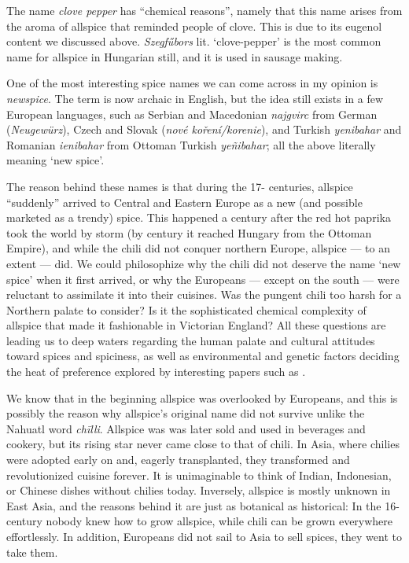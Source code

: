 The name \textit{clove pepper} has ``chemical reasons'', namely that this name arises from the aroma of allspice that reminded people of clove. This is due to its eugenol content we discussed above. \textit{Szegfűbors} lit. `clove-pepper' is the most common name for allspice in Hungarian still, and it is used in sausage making.

One of the most interesting spice names we can come across in my opinion is \textit{newspice}. The term is now archaic in English, but the idea still exists in a few European languages, such as Serbian and Macedonian  \textit{najgvirc} from German (\textit{Neugewürz}), Czech and Slovak (\textit{nové koření/korenie}), and Turkish \textit{yenibahar} and Romanian \textit{ienibahar} from Ottoman Turkish  \textit{yeñibahar}; all the above literally meaning `new spice'.

The reason behind these names is that during the 17- centuries, allspice ``suddenly'' arrived to Central and Eastern Europe as a new (and possible marketed as a trendy) spice. This happened a century after the red hot paprika took the world by storm (by  century it reached Hungary from the Ottoman Empire), and while the chili did not conquer northern Europe, allspice --- to an extent --- did. We could philosophize why the chili did not deserve the name `new spice' when it first arrived, or why the Europeans --- except on the south --- were reluctant to assimilate it into their cuisines. Was the pungent chili too harsh for a Northern palate to consider? Is it the sophisticated chemical complexity of allspice that made it fashionable in Victorian England? All these questions are leading us to deep waters regarding the human palate and cultural attitudes toward spices and spiciness, as well as environmental and genetic factors deciding the heat of preference explored by interesting papers such as \textcite{tornwall_why_2012,spence_why_2018}.

We know that in the beginning allspice was overlooked by Europeans, and this is possibly the reason why allspice's original name did not survive unlike the Nahuatl word \textit{chīlli}. Allspice was was later sold and used in beverages and cookery, but its rising star never came close to that of chili.
In Asia, where chilies were adopted early on and, eagerly transplanted, they transformed and revolutionized cuisine forever. It is unimaginable to think of Indian, Indonesian, or Chinese dishes without chilies today. Inversely, allspice is mostly unknown in East Asia, and the reasons behind it are just as botanical as historical: In the 16- century nobody knew how to grow allspice, while chili can be grown everywhere effortlessly. In addition, Europeans did not sail to Asia to sell spices, they went to take them. 

